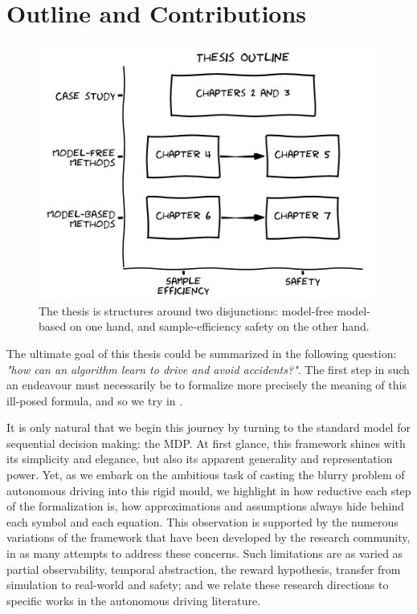 \section{Outline and Contributions}

\begin{figure}[ht]
	\includegraphics[width=0.9\linewidth]{img/outline}
	\caption{The thesis is structures around two disjunctions: model-free \vs model-based on one hand, and sample-efficiency \vs safety on the other hand.}
	\label{fig:thesis-outline}
\end{figure}

The ultimate goal of this thesis could be summarized in the following question: \emph{"how can an algorithm learn to drive and avoid accidents?"}. The first step in such an endeavour must necessarily be to formalize more precisely the meaning of this ill-posed formula, and so we try in .

It is only natural that we begin this journey by turning to the standard model for sequential decision making: the \acl*{MDP}. At first glance, this framework shines with its simplicity and elegance, but also its apparent generality and representation power. Yet, as we embark on the ambitious task of casting the blurry problem of autonomous driving into this rigid mould, we highlight in  how reductive each step of the formalization is, how approximations and assumptions always hide behind each symbol and each equation. This observation is supported by the numerous variations of the framework that have been developed by the research community, in as many attempts to address these concerns. Such limitations are as varied as partial observability, temporal abstraction, the reward hypothesis, transfer from simulation to real-world and safety; and we relate these research directions to specific works in the autonomous driving literature.

